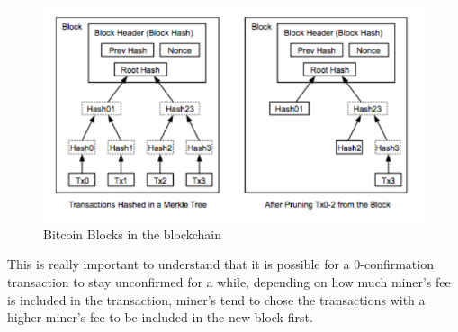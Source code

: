 \begin{figure}
\centering
\includegraphics[width=\linewidth]{fig/bitcoinblocks.png}
  \caption{Bitcoin Blocks in the blockchain}
	\source{~\cite[Nak08]}
\label{fig:bitcoinblocks}
\end{figure}

This is really important to understand that it is possible for a 0-confirmation transaction to stay unconfirmed for a while, depending on how much miner's fee is included in the transaction, miner's tend to chose the transactions with a higher miner's fee to be included in the new block first.

